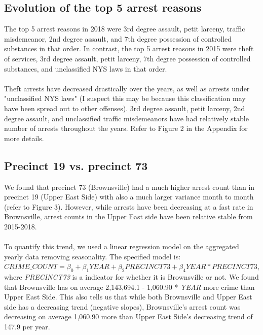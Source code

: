 \documentclass[11pt]{article}\usepackage[]{graphicx}\usepackage[]{color}
\begin{document}
\subsection{Evolution of the top 5 arrest reasons}
The top 5 arrest reasons in 2018 were 3rd degree assault, petit larceny, traffic misdemeanor, 2nd degree assault, and 7th degree possession of controlled substances in that order. In contrast, the top 5 arrest reasons in 2015 were theft of services, 3rd degree assault, petit larceny, 7th degree possession of controlled substances, and unclassified NYS laws in that order.
\\\\
Theft arrests have decreased drastically over the years, as well as arrests under "unclassified NYS laws" (I suspect this may be because this classification may have been spread out to other offenses). 3rd degree assault, petit larceny, 2nd degree assault, and unclassified traffic misdemeanors have had relatively stable number of arrests throughout the years. Refer to Figure 2 in the Appendix for more details.

\subsection{Precinct 19 vs. precinct 73}
We found that precinct 73 (Brownsville) had a much higher arrest count than in precinct 19 (Upper East Side) with also a much larger variance month to month (refer to Figure 3). However, while arrests have been decreasing at a fast rate in Brownsville, arrest counts in the Upper East side have been relative stable from 2015-2018. 
\\\\
To quantify this trend, we used a linear regression model on the aggregated yearly data removing seasonality. The specified model is: $CRIME\_COUNT = \beta_0 + \beta_1YEAR + \beta_2PRECINCT73 +\beta_4YEAR*PRECINCT73$, where \textit{PRECINCT73} is a indicator for whether it is Brownsville or not. We found that Brownsville has on average 2,143,694.1 - 1,060.90 * \textit{YEAR} more crime than Upper East Side. This also tells us that while both Brownsville and Upper East side has a decreasing trend (negative slopes), Brownsville's arrest count was decreasing on average 1,060.90 more than Upper East Side's decreasing trend of 147.9 per year.
\end{document}
